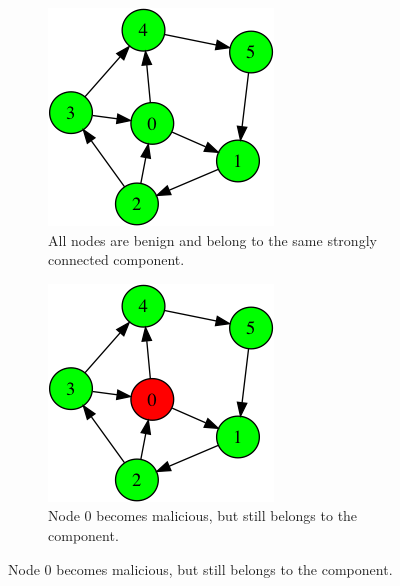 \begin{figure}
\centering

\begin{subfigure}{0.30\textwidth}
\includegraphics[width=\linewidth]{images/rogue/0.png}
\caption{All nodes are benign and belong to the same strongly connected component.} \label{fig:rogue0}
\end{subfigure}
\hspace*{1cm} %
\begin{subfigure}{0.3\textwidth}
\includegraphics[width=\linewidth]{images/rogue/1.png}
\caption{Node $0$ becomes malicious, but still belongs to the component.} \label{fig:rogue1}
\end{subfigure}


\end{figure}
